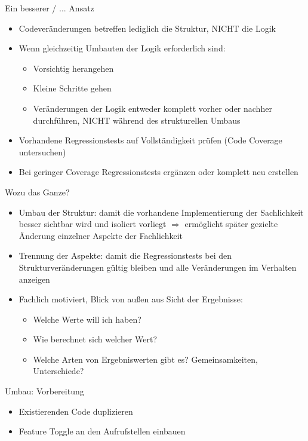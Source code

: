 \begin{frame}[t,fragile]{Ein besserer / ... Ansatz}
\begin{itemize}
\item Codeveränderungen betreffen lediglich die Struktur, NICHT die Logik
\item Wenn gleichzeitig Umbauten der Logik erforderlich sind:
\begin{itemize}
\item Vorsichtig herangehen
\item Kleine Schritte gehen
\item Veränderungen der Logik entweder komplett vorher oder nachher durchführen, NICHT während des strukturellen Umbaus
\end{itemize}

\item Vorhandene Regressionstests auf Vollständigkeit prüfen (Code Coverage untersuchen)
\item Bei geringer Coverage Regressionstests ergänzen oder komplett neu erstellen
\end{itemize}
\end{frame}



\begin{frame}[t,fragile]{Wozu das Ganze?}
\begin{itemize}
\item Umbau der Struktur: damit die vorhandene Implementierung der Sachlichkeit besser sichtbar wird und isoliert vorliegt
$\Rightarrow$ ermöglicht später gezielte Änderung einzelner Aspekte der Fachlichkeit
\item Trennung der Aspekte: damit die Regressionstests bei den Strukturveränderungen gültig bleiben und alle Veränderungen im Verhalten anzeigen
\item Fachlich motiviert, Blick von außen aus Sicht der Ergebnisse:
\begin{itemize}
\item Welche Werte will ich haben?
\item Wie berechnet sich welcher Wert?
\item Welche Arten von Ergebniswerten gibt es? Gemeinsamkeiten, Unterschiede?
\end{itemize}
\end{itemize}
\end{frame}

\begin{frame}[t,fragile]{Umbau: Vorbereitung}
\begin{itemize}
\item Existierenden Code duplizieren
\item Feature Toggle an den Aufrufstellen einbauen
\end{itemize}
\end{frame}
 
